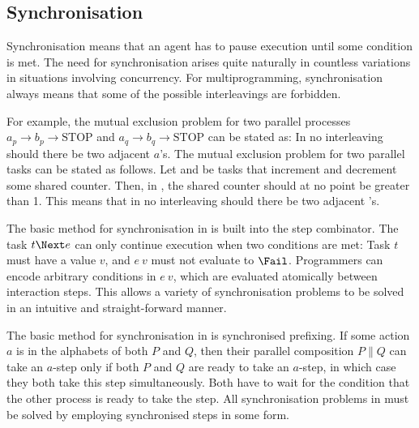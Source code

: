 


\subsection{Synchronisation}

Synchronisation means that an agent has to pause execution until some condition is met.
The need for synchronisation arises quite naturally in countless variations in situations involving concurrency.
For multiprogramming, synchronisation always means that some of the possible interleavings are forbidden.

For example, the mutual exclusion problem for two parallel processes $a_p \to b_p \to \text{STOP} $ and $a_q \to b_q \to \text{STOP}$ can be stated as:
In no interleaving should there be two adjacent $a$'s.
%
The mutual exclusion problem for two parallel tasks can be stated as follows.
Let  and  be tasks that increment and decrement some shared counter.
Then, in , the shared counter should at no point be greater than 1.
This means that in no interleaving should there be two adjacent 's.

The basic method for synchronisation in \TOP is built into the step combinator.
The task $t \Next e$ can only continue execution when two conditions are met:
Task $t$ must have a value $v$, and $e\ v$ must not evaluate to $\Fail$.
Programmers can encode arbitrary conditions in $e\ v$, which are evaluated atomically between interaction steps.
This allows a variety of synchronisation problems to be solved in an intuitive and straight-forward manner.

The basic method for synchronisation in \CSP is synchronised prefixing.
If some action $a$ is in the alphabets of both $P$ and $Q$, then their parallel composition $P \parallel Q$ can take an $a$-step only if both $P$ and $Q$ are ready to take an $a$-step, in which case they both take this step simultaneously.
Both have to wait for the condition that the other process is ready to take the step.
All synchronisation problems in \CSP must be solved by employing synchronised steps in some form.




